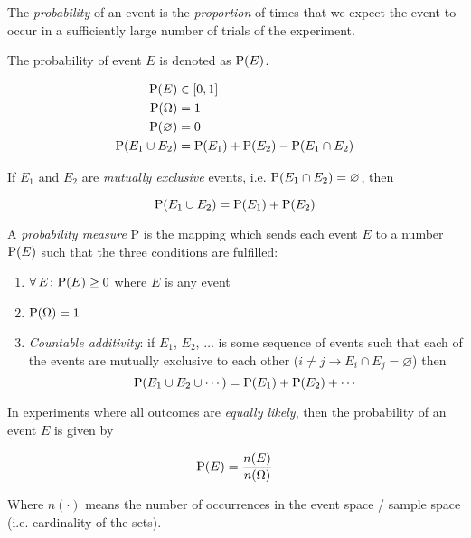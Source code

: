 \begin{definition}[Probability]
    The \textit{probability} of an event is the \textit{proportion} of times that we expect the event to occur in a sufficiently large number of trials of the experiment.
    
    The probability of event $E$ is denoted as $\mathrm{P}(E)$.
\end{definition}

\begin{definition}
    \begin{align}
        \mathrm{P}(E) &\in [0, 1] \\
        \mathrm{P}(\Omega) &= 1 \\
        \mathrm{P}(\varnothing) &= 0 \\
        \mathrm{P}(E_1 \cup E_2) &= \mathrm{P}(E_1) + \mathrm{P}(E_2) - \mathrm{P}(E_1 \cap E_2)
    \end{align}
    
    If $E_1$ and $E_2$ are \textit{mutually exclusive} events, i.e. $\mathrm{P}(E_1 \cap E_2) = \varnothing$, then
    
    \begin{equation}
        \mathrm{P}(E_1 \cup E_2) = \mathrm{P}(E_1) + \mathrm{P}(E_2)
    \end{equation}
\end{definition}

\begin{definition}
    A \textit{probability measure} $\mathrm{P}$ is the mapping which sends each event $E$ to a number $\mathrm{P}(E)$ such that the three conditions are fulfilled:
    
    \begin{enumerate}
        \item $\operatorname{\forall} E \colon \mathrm{P}(E) \ge 0$ where $E$ is any event
        \item $\mathrm{P}(\Omega) = 1$
        \item \textit{Countable additivity}: if $E_1$, $E_2$, $\ldots$ is some sequence of events such that each of the events are mutually exclusive to each other ($i \ne j \to E_i \cap E_j = \varnothing$) then
            \begin{equation}
                \mathrm{P}(E_1 \cup E_2 \cup \cdots) = \mathrm{P}(E_1) + \mathrm{P}(E_2) + \cdots
            \end{equation}
    \end{enumerate}
\end{definition}

\begin{definition}
    In experiments where all outcomes are \textit{equally likely}, then the probability of an event $E$ is given by
    
    \begin{equation}
        \mathrm{P}(E) = \frac{n(E)}{n(\Omega)}
    \end{equation}
    
    Where $n(\cdot)$ means the number of occurrences in the event space / sample space (i.e. cardinality of the sets).
\end{definition}

